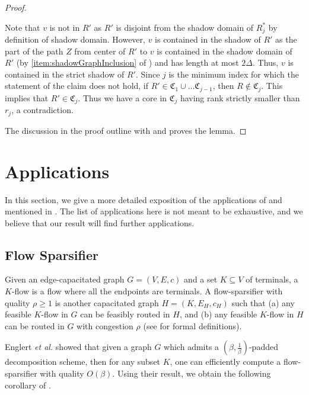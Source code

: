 \documentclass{article}
\newcommand{\etal}{{\em et al. \xspace}}
\def\core{R}
\def\C{\mathfrak{C}}
\begin{document}
\begin{proof}
\begin{subproof}
		Note that $v$ is not in $\core'$ as $\core'$ is disjoint from the shadow domain of $\core^*_j$ by definition of shadow domain.
		However, $v$ is contained in the shadow of $\core'$ as the part of the path $Z$ from center of $\core'$ to $v$ is contained in the shadow domain of $\core'$ (by \cref{item:shadowGraphInclusion} of ) and has length at most $2\Delta$.
		Thus, $v$ is contained in the strict shadow of $\core'$.
		Since $j$ is the minimum index for which the statement of the claim does not hold, if $\core'\in \C_1 \cup \ldots \C_{j-1}$, then $\core \not \in \C_j$. This implies that $\core'\in \C_j$.
		Thus we have a core in $\C_j$ having rank strictly smaller than $r_j$, a contradiction.
	\end{subproof}
	
	The discussion in the proof outline with  and  proves the lemma. 
\end{proof}





\section{Applications} \label{sec:apps}

In this section, we give a more detailed exposition of the applications of  and  mentioned in . The list of applications here is not meant to be exhaustive, and we believe that our result will find further applications. 

\subsection{Flow Sparsifier}
Given an edge-capacitated graph $G = (V,E,c)$ and a set $K\subseteq V$ of terminals, a $K$-flow is a flow where all the endpoints are terminals. A flow-sparsifier with quality $\rho\ge1$ is another capacitated graph $H = (K,E_H, c_H)$ such that (a) any feasible $K$-flow in $G$ can be feasibly routed in $H$, and (b) any feasible $K$-flow in $H$ can be routed in $G$ with congestion $\rho$ (see \cite{EGKRTT14} for formal definitions).

Englert \etal \cite{EGKRTT14} showed that given a graph $G$ which admits a $(\beta,\frac1\beta)$-padded decomposition scheme, then for any subset $K$, one can efficiently compute a flow-sparsifier with
quality $O(\beta)$. Using their result, we obtain the following corollary of . 
\end{document}
